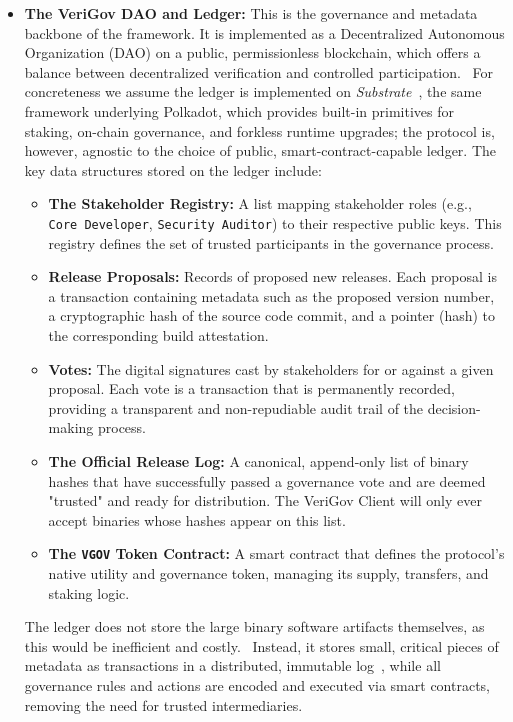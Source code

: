 \documentclass{article}
\begin{document}
\begin{itemize}
\item \textbf{The VeriGov DAO and Ledger:} This is the governance and metadata backbone of the framework. It is implemented as a Decentralized Autonomous Organization (DAO) on a public, permissionless blockchain, which offers a balance between decentralized verification and controlled participation.~\cite{dupont2017dao} For concreteness we assume the ledger is implemented on \emph{Substrate}~\cite{wood2016polkadot}, the same framework underlying Polkadot, which provides built-in primitives for staking, on-chain governance, and forkless runtime upgrades; the protocol is, however, agnostic to the choice of public, smart-contract-capable ledger. The key data structures stored on the ledger include:
\begin{itemize}
\item \textbf{The Stakeholder Registry:} A list mapping stakeholder roles (e.g., \lstinline{Core Developer}, \lstinline{Security Auditor}) to their respective public keys. This registry defines the set of trusted participants in the governance process.
\item \textbf{Release Proposals:} Records of proposed new releases. Each proposal is a transaction containing metadata such as the proposed version number, a cryptographic hash of the source code commit, and a pointer (hash) to the corresponding build attestation.
\item \textbf{Votes:} The digital signatures cast by stakeholders for or against a given proposal. Each vote is a transaction that is permanently recorded, providing a transparent and non-repudiable audit trail of the decision-making process.
\item \textbf{The Official Release Log:} A canonical, append-only list of binary hashes that have successfully passed a governance vote and are deemed "trusted" and ready for distribution. The VeriGov Client will only ever accept binaries whose hashes appear on this list.
\item \textbf{The \texttt{VGOV} Token Contract:} A smart contract that defines the protocol's native utility and governance token, managing its supply, transfers, and staking logic.~\cite{buterin2014ethereum}
\end{itemize}
The ledger does not store the large binary software artifacts themselves, as this would be inefficient and costly.~\cite{benet2014ipfs} Instead, it stores small, critical pieces of metadata as transactions in a distributed, immutable log~\cite{nakamoto2008bitcoin}, while all governance rules and actions are encoded and executed via smart contracts, removing the need for trusted intermediaries.~\cite{buterin2014ethereum}


\end{itemize}
\end{document}
